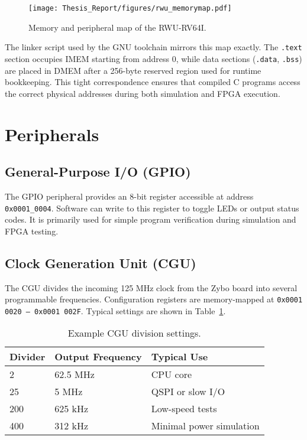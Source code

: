 \begin{figure}[H]
  \centering
  \texttt{[image: Thesis\_Report/figures/rwu\_memorymap.pdf]}
  \caption{Memory and peripheral map of the RWU-RV64I.}
  \label{fig:rwu_memorymap}
\end{figure}

The linker script used by the GNU toolchain mirrors this map exactly.  
The \texttt{.text} section occupies IMEM starting from address 0, while data sections (\texttt{.data}, \texttt{.bss}) are placed in DMEM after a 256-byte reserved region used for runtime bookkeeping.  
This tight correspondence ensures that compiled C programs access the correct physical addresses during both simulation and FPGA execution.

\section{Peripherals}
\subsection{General-Purpose I/O (GPIO)}
The GPIO peripheral provides an 8-bit register accessible at address \texttt{0x0001\_0004}.  
Software can write to this register to toggle LEDs or output status codes.  
It is primarily used for simple program verification during simulation and FPGA testing.

\subsection{Clock Generation Unit (CGU)}
The CGU divides the incoming 125 MHz clock from the Zybo board into several programmable frequencies.  
Configuration registers are memory-mapped at \texttt{0x0001 0020 – 0x0001 002F}.  
Typical settings are shown in Table~\ref{tab:cgu}.

\begin{table}[H]
\centering
\caption{Example CGU division settings.}
\label{tab:cgu}
\begin{tabular}{lll}
\toprule
\textbf{Divider} & \textbf{Output Frequency} & \textbf{Typical Use}\\
\midrule
2 & 62.5 MHz & CPU core\\
25 & 5 MHz & QSPI or slow I/O\\
200 & 625 kHz & Low-speed tests\\
400 & 312 kHz & Minimal power simulation\\
\bottomrule
\end{tabular}
\end{table}

